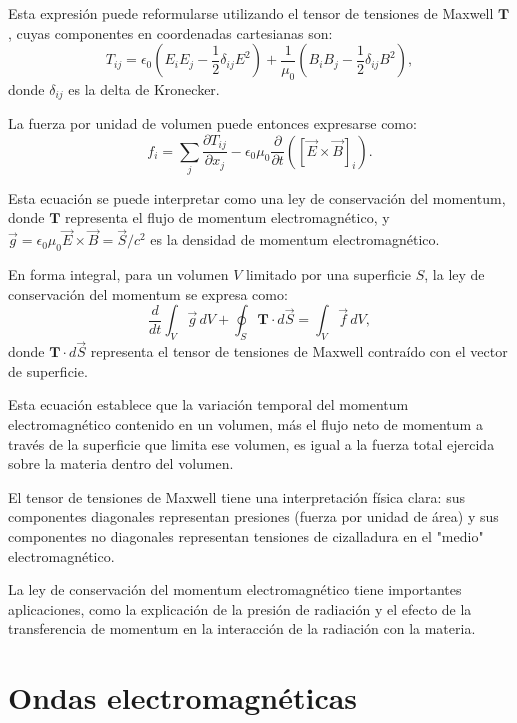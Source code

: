 \documentclass[12pt,a4paper]{book}
\begin{document}
Esta expresión puede reformularse utilizando el tensor de tensiones de Maxwell $\mathbf{T}$, cuyas componentes en coordenadas cartesianas son:
\begin{equation}
T_{ij} = \epsilon_0 \left(E_i E_j - \frac{1}{2}\delta_{ij}E^2\right) + \frac{1}{\mu_0}\left(B_i B_j - \frac{1}{2}\delta_{ij}B^2\right),
\end{equation}
donde $\delta_{ij}$ es la delta de Kronecker.

La fuerza por unidad de volumen puede entonces expresarse como:
\begin{equation}
f_i = \sum_j \frac{\partial T_{ij}}{\partial x_j} - \epsilon_0 \mu_0 \frac{\partial}{\partial t}([\vec{E} \times \vec{B}]_i).
\end{equation}

Esta ecuación se puede interpretar como una ley de conservación del momentum, donde $\mathbf{T}$ representa el flujo de momentum electromagnético, y $\vec{g} = \epsilon_0 \mu_0 \vec{E} \times \vec{B} = \vec{S}/c^2$ es la densidad de momentum electromagnético.

En forma integral, para un volumen $V$ limitado por una superficie $S$, la ley de conservación del momentum se expresa como:
\begin{equation}
\frac{d}{dt}\int_V \vec{g} \, dV + \oint_S \mathbf{T} \cdot d\vec{S} = \int_V \vec{f} \, dV,
\end{equation}
donde $\mathbf{T} \cdot d\vec{S}$ representa el tensor de tensiones de Maxwell contraído con el vector de superficie.

Esta ecuación establece que la variación temporal del momentum electromagnético contenido en un volumen, más el flujo neto de momentum a través de la superficie que limita ese volumen, es igual a la fuerza total ejercida sobre la materia dentro del volumen.

El tensor de tensiones de Maxwell tiene una interpretación física clara: sus componentes diagonales representan presiones (fuerza por unidad de área) y sus componentes no diagonales representan tensiones de cizalladura en el "medio" electromagnético.

La ley de conservación del momentum electromagnético tiene importantes aplicaciones, como la explicación de la presión de radiación y el efecto de la transferencia de momentum en la interacción de la radiación con la materia.

\section{Ondas electromagnéticas}
\end{document}
